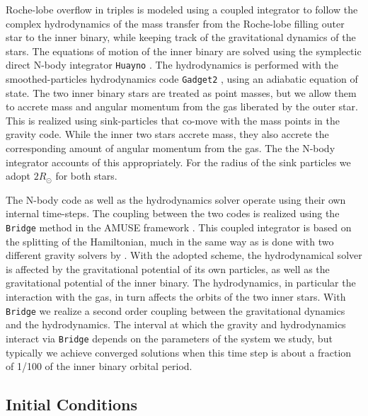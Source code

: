 \documentclass{aastex62}
\begin{document}
Roche-lobe overflow in triples is modeled using a coupled integrator
to follow the complex hydrodynamics of the mass transfer from the
Roche-lobe filling outer star to the inner binary, while keeping track
of the gravitational dynamics of the stars.  The equations of motion
of the inner binary are solved using the symplectic direct N-body
integrator \texttt{Huayno} \citep{2012NewA...17..711P}. The
hydrodynamics is performed with the smoothed-particles hydrodynamics
code \texttt{Gadget2} \citep{2000ascl.soft03001S}, using an adiabatic
equation of state.  The two inner binary stars are treated as point
masses, but we allow them to accrete mass and angular momentum from
the gas liberated by the outer star.  This is realized using
sink-particles that co-move with the mass points in the gravity
code. While the inner two stars accrete mass, they also accrete the
corresponding amount of angular momentum from the gas.  The the N-body
integrator accounts of this appropriately.  For the radius of the sink
particles we adopt $2 R_\odot$ for both stars.

The N-body code as well as the hydrodynamics solver operate using
their own internal time-steps. The coupling between the two codes is
realized using the \texttt{Bridge} method in the AMUSE framework
\citep[see Sect.\.4.3.1 in][]{2013CoPhC.183..456P}.  This coupled
integrator is based on the splitting of the Hamiltonian, much in the
same way as is done with two different gravity solvers by
\cite{2007PASJ...59.1095F}. With the adopted scheme, the
hydrodynamical solver is affected by the gravitational potential of
its own particles, as well as the gravitational potential of the inner
binary. The hydrodynamics, in particular the interaction with the gas,
in turn affects the orbits of the two inner stars. With
\texttt{Bridge} we realize a second order coupling between the
gravitational dynamics and the hydrodynamics.  The interval at which
the gravity and hydrodynamics interact via \texttt{Bridge} depends on
the parameters of the system we study, but typically we achieve
converged solutions when this time step is about a fraction of 1/100
of the inner binary orbital period.

\subsection{Initial Conditions} \label{Sect:ICs}
\end{document}
